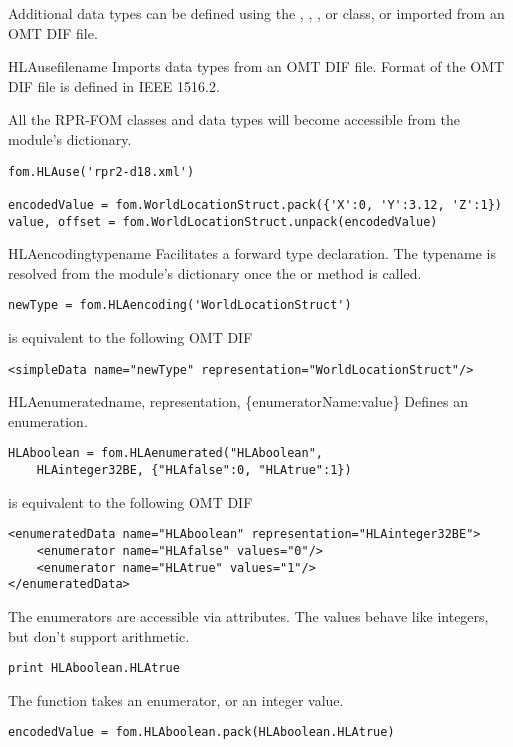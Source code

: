 Additional data types can be defined using the ,
, , or 
class, or imported from an OMT DIF file.

\begin{funcdesc}{HLAuse}{filename}
Imports data types from an OMT DIF file. Format of the OMT DIF file is
defined in IEEE 1516.2.

All the RPR-FOM classes and data types will become accessible from the
module's dictionary.

\begin{verbatim}
fom.HLAuse('rpr2-d18.xml')

encodedValue = fom.WorldLocationStruct.pack({'X':0, 'Y':3.12, 'Z':1})
value, offset = fom.WorldLocationStruct.unpack(encodedValue)
\end{verbatim}

\end{funcdesc}

\begin{classdesc}{HLAencoding}{typename}
Facilitates a forward type declaration. The typename is resolved from the
module's dictionary once the  or  method is called.

\begin{verbatim}
newType = fom.HLAencoding('WorldLocationStruct')
\end{verbatim}
is equivalent to the following OMT DIF
\begin{verbatim}
<simpleData name="newType" representation="WorldLocationStruct"/>
\end{verbatim}
\end{classdesc}

\begin{classdesc}{HLAenumerated}{name, representation, \{enumeratorName:value\}}
Defines an enumeration.

\begin{verbatim}
HLAboolean = fom.HLAenumerated("HLAboolean",
    HLAinteger32BE, {"HLAfalse":0, "HLAtrue":1})
\end{verbatim}
is equivalent to the following OMT DIF
\begin{verbatim}
<enumeratedData name="HLAboolean" representation="HLAinteger32BE">
    <enumerator name="HLAfalse" values="0"/>
    <enumerator name="HLAtrue" values="1"/>
</enumeratedData>
\end{verbatim}

The enumerators are accessible via attributes. The values behave like integers,
but don't support arithmetic.
\begin{verbatim}
print HLAboolean.HLAtrue
\end{verbatim}

The  function takes an enumerator, or an integer value.
\begin{verbatim}
encodedValue = fom.HLAboolean.pack(HLAboolean.HLAtrue)
\end{verbatim}
\end{classdesc}


